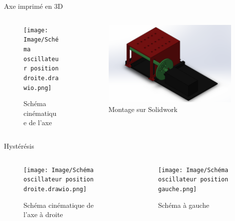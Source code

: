 \documentclass{beamer}
\begin{document}
\begin{frame}{Axe imprimé en 3D}
	\begin{columns}
		\begin{column}{0.5\textwidth}
			\begin{figure}
				\texttt{[image: Image/Schéma oscillateur position droite.drawio.png]}
				\caption{Schéma cinématique de l'axe}
			\end{figure}
		\end{column}
		\begin{column}{0.5\textwidth}
			\begin{figure}
				\includegraphics[width=\textwidth]{Image/montage excentrique.png}
				\caption{Montage sur Solidwork}
			\end{figure}
		\end{column}
	\end{columns}
\end{frame}
\begin{frame}{Hystérésis}
	\begin{columns}
		\begin{column}{0.5\textwidth}
			\begin{figure}
				\texttt{[image: Image/Schéma oscillateur position droite.drawio.png]}
				\caption{Schéma cinématique de l'axe à droite}
			\end{figure}
		\end{column}
		\begin{column}{0.5\textwidth}
			\begin{figure}
				\texttt{[image: Image/Schéma oscillateur position gauche.png]}
				\caption{Schéma à gauche}
			\end{figure}
		\end{column}
	\end{columns}
\end{frame}
\end{document}
